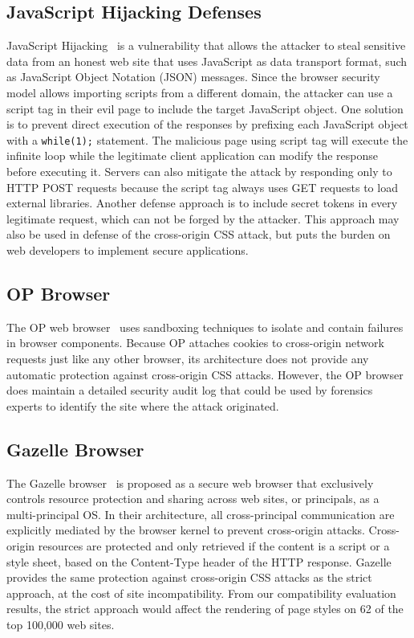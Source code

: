 \documentclass{acm_proc_article-sp}
\begin{document}
\subsection{JavaScript Hijacking Defenses}
JavaScript Hijacking~\cite{jshijacking} is a vulnerability that allows the
attacker to steal sensitive data from an honest web site that uses JavaScript
as data transport format, such as JavaScript Object Notation (JSON) messages.
Since the browser security model allows importing scripts from a different
domain, the attacker can use a script tag in their evil page to include the
target JavaScript object. One solution is to prevent direct
execution of the responses by prefixing each JavaScript object with a
\texttt{while(1);} statement. The malicious page using script tag will execute
the infinite loop while the legitimate client application can modify the
response before executing it. Servers can also mitigate the attack by responding only to HTTP POST requests because the script tag always uses GET requests to load external libraries. Another defense approach is to include secret tokens in every legitimate request, which can not be forged by the attacker.
This approach may also be used in defense of the cross-origin
CSS attack, but puts the burden on web developers to implement secure
applications.

\subsection{OP Browser}
The OP web browser~\cite{op-browser} uses sandboxing techniques to isolate and
contain failures in browser components. Because OP attaches cookies to
cross-origin network requests just like any other browser, its architecture
does not provide any automatic protection against cross-origin CSS attacks.
However, the OP browser does maintain a detailed security audit log that could
be used by forensics experts to identify the site where the attack originated.

\subsection{Gazelle Browser}
The Gazelle browser~\cite{gazelle} is proposed as a secure web browser that exclusively controls resource protection and sharing across web sites, or principals, as a multi-principal OS. In their architecture, all cross-principal communication are explicitly mediated by the browser kernel to prevent cross-origin attacks. Cross-origin resources are protected and only retrieved if the content is a script or a style sheet, based on the Content-Type header of the HTTP response. Gazelle provides the same protection against cross-origin CSS attacks as the strict approach, at the cost of site incompatibility. From our compatibility evaluation results, the strict approach would affect the rendering of page styles on 62 of the top 100,000 web sites.
\end{document}
